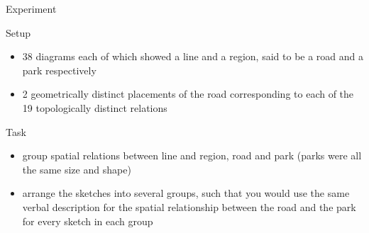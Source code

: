 

\begin{frame}{Experiment}
	\begin{block}{Setup}
		\begin{itemize}
			\item 38 diagrams each of which showed a line and a region, said to be a road and a park respectively
			
			\item 2 geometrically distinct placements of the road corresponding to each of the 19 topologically distinct relations
		\end{itemize}
	\end{block}
	\begin{block}{Task}
		\begin{itemize}
			\item group spatial relations between line and region, road and park (parks were all the same size and shape)
			
			\item arrange the sketches into several groups, such that you would use the same verbal description for the spatial relationship between the road and the park for every sketch in each group
		\end{itemize}
	\end{block}
\end{frame}

